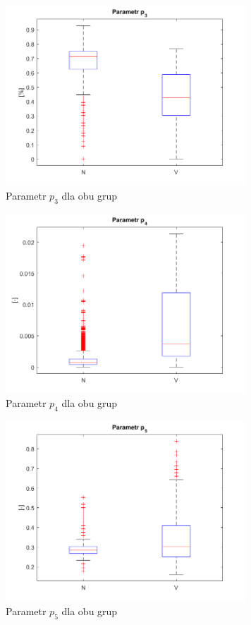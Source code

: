 \documentclass[[10pt,a4paper]{article}
\begin{document}
\begin{figure}[H]
	\begin{center}
		\includegraphics[width=9cm]{p3.png}
		\caption{Parametr $p_3$ dla obu grup}
	\end{center}
\end{figure}

\begin{figure}[H]
	\begin{center}
		\includegraphics[width=9cm]{p4.png}
		\caption{Parametr $p_4$ dla obu grup}
	\end{center}
\end{figure}

\begin{figure}[H]
	\begin{center}
		\includegraphics[width=9cm]{p5.png}
		\caption{Parametr $p_5$ dla obu grup}
	\end{center}
\end{figure}
\end{document}
